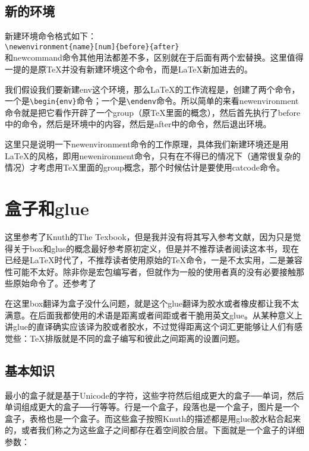 \documentclass[11pt,oneside]{book}
\begin{document}
      \section{新的环境}
      \label{sec:新的环境}
      新建环境命令格式如下：\\
      \verb+\newenvironment{name}[num]{before}{after}+\\
      和newcommand命令其他用法都差不多，区别就在于后面有两个宏替换。这里值得一提的是原\TeX 并没有新建环境这个命令，而是\LaTeX 新加进去的。

      我们假设我们要新建env这个环境，那么\LaTeX 的工作流程是，创建了两个命令，一个是\verb+\begin{env}+命令；一个是\verb+\endenv+命令。所以简单的来看newenvironment命令就是把它看作开辟了一个group（原\TeX 里面的概念），然后首先执行了before中的命令，然后是环境中的内容，然后是after中的命令，然后退出环境。

        这里只是说明一下newenvironment命令的工作原理，具体我们新建环境还是用\LaTeX 的风格，即用newenironment命令，只有在不得已的情况下（通常很复杂的情况）才考虑用\TeX 里面的group概念，那个时候估计是要使用catcode命令。



        \chapter{盒子和glue}
        \label{sec:盒子和glue}
        \begin{flushright}
          \begin{notecard}[olive!30]{20em}
            这里参考了Knuth的The Texbook，但是我并没有将其写入参考文献，因为只是觉得关于box和glue的概念最好参考原初定义，但是并不推荐读者阅读这本书，现在已经是\LaTeX 时代了，不推荐读者使用原始的\TeX 命令，一是不太实用，二是兼容性可能不太好。除非你是宏包编写者，但就作为一般的使用者真的没有必要接触那些原始命令了。还参考了\cite{boxes}
          \end{notecard}
        \end{flushright}

        在这里box翻译为盒子没什么问题，就是这个glue翻译为胶水或者橡皮都让我不太满意。在后面我都使用的术语是距离或者间距或者干脆用英文glue。从某种意义上讲glue的直译确实应该译为胶或者胶水，不过觉得距离这个词汇更能够让人们有感觉些：\TeX 排版就是不同的盒子编写和彼此之间距离的设置问题。

        \section{基本知识}
        最小的盒子就是基于Unicode的字符，这些字符然后组成更大的盒子──单词，然后单词组成更大的盒子──行等等。行是一个盒子，段落也是一个盒子，图片是一个盒子，表格也是一个盒子。而这些盒子按照Knuth的描述都是用glue胶水粘合起来的，或者我们称之为这些盒子之间都存在着空间胶合层。下面就是一个盒子的详细参数：
\end{document}
